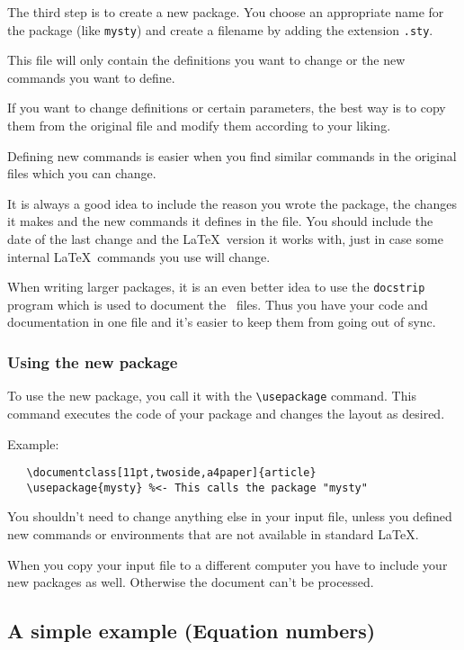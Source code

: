 \documentclass[twoside,a4paper]{refart}
\begin{document}
The third step is to create a new package. You choose an appropriate 
name for the package (like \texttt{mysty}) and create a filename by 
adding the extension \texttt{.sty}.

This file will only contain the definitions you want to change or the 
new commands you want to define.

If you want to change definitions or certain parameters, the best way 
is to copy them from the original file and modify them according to 
your liking.

Defining new commands is easier when you find similar commands in the 
original files which you can change.

It is always a good idea to include the reason you wrote the package, 
the changes it makes and the new commands it defines in the file. You 
should include the date of the last change and the \LaTeX\ version it 
works with, just in case some internal \LaTeX\ commands you use will change.

When writing larger packages, it is an even better idea to use the 
\texttt{docstrip} program which is used to document the \LaTeXe\ files.  Thus 
you have your code and documentation in one file and it's easier to 
keep them from going out of sync.

\subsubsection{Using the new package}

To use the new package, you call it with the \verb|\usepackage| command. 
This command executes the code of your package and changes the layout 
as desired.

Example:

\begin{verbatim}
   \documentclass[11pt,twoside,a4paper]{article}
   \usepackage{mysty} %<- This calls the package "mysty"
\end{verbatim}

You shouldn't need to change anything else in your input file, unless 
you defined new commands or environments that are not available in 
standard \LaTeX.

\attention
When you copy your input file to a different computer you have to 
include your new packages as well. Otherwise the document can't be 
processed.


\subsection{A simple example (Equation numbers)}
\end{document}
